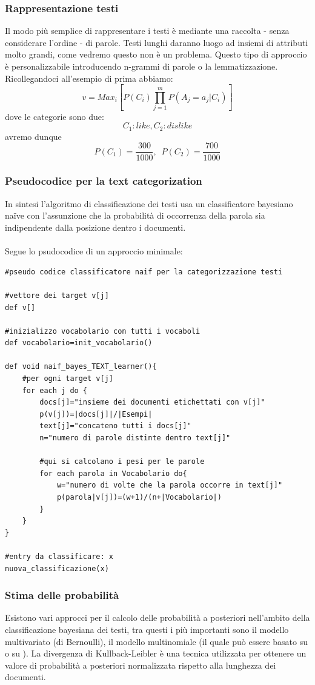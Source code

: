 \documentclass{article}
\theoremstyle{plain}
\theoremstyle{definition}
\begin{document}
\subsubsection{Rappresentazione testi}
Il modo più semplice di rappresentare i testi è mediante una raccolta - senza considerare l'ordine - di parole. Testi lunghi daranno luogo ad insiemi di attributi molto grandi, come vedremo questo non è un problema. Questo tipo di approccio è personalizzabile introducendo n-grammi di parole o la lemmatizzazione.
Ricollegandoci all'esempio di prima abbiamo: 
$$v=Max_i [P(C_i)\prod_{j=1}^m P(A_j=a_j|C_i)]$$
dove le categorie sono due: $$C_1:like, C_2:dislike$$
avremo dunque $$P(C_1)=\frac{300}{1000},\,\,\, P(C_2)=\frac{700}{1000}$$

\subsubsection{Pseudocodice per la text categorization}
In sintesi l'algoritmo di classificazione dei testi usa un classificatore bayesiano naïve con l'assunzione che la probabilità di occorrenza della parola sia indipendente dalla posizione dentro i documenti.
\\
\\
Segue lo psudocodice di un approccio minimale:
\begin{lstlisting}
#pseudo codice classificatore naif per la categorizzazione testi

#vettore dei target v[j]
def v[]

#inizializzo vocabolario con tutti i vocaboli
def vocabolario=init_vocabolario()

def void naif_bayes_TEXT_learner(){
	#per ogni target v[j]
	for each j do {
		docs[j]="insieme dei documenti etichettati con v[j]"
		p(v[j])=|docs[j]|/|Esempi|
		text[j]="concateno tutti i docs[j]"
		n="numero di parole distinte dentro text[j]"
		
		#qui si calcolano i pesi per le parole
		for each parola in Vocabolario do{
			w="numero di volte che la parola occorre in text[j]"
			p(parola|v[j])=(w+1)/(n+|Vocabolario|)
		}
	}
}

#entry da classificare: x
nuova_classificazione(x)
\end{lstlisting}

\newpage
\subsubsection{Stima delle probabilità}
Esistono vari approcci per il calcolo delle probabilità a posteriori nell'ambito della classificazione bayesiana dei testi, tra questi i più importanti sono il modello multivariato (di Bernoulli), il modello multinomiale (il quale può essere basato su  o su ). La divergenza di Kullback-Leibler è una tecnica utilizzata per ottenere un valore di probabilità a posteriori normalizzata rispetto alla lunghezza dei documenti.
\end{document}
